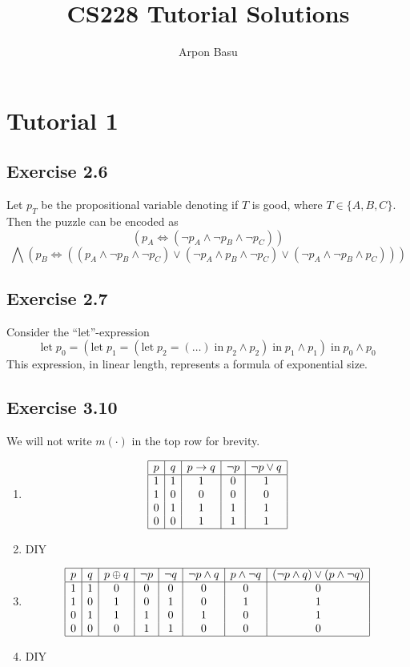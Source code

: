 \documentclass{article}
\title{CS228 Tutorial Solutions}
\author{Arpon Basu}
\begin{document}
\maketitle
\tableofcontents
\pagebreak
\section{Tutorial 1}
\subsection*{Exercise 2.6}
Let $p_T$ be the propositional variable denoting if $T$ is good, where $T\in\{A, B, C\}$. 
Then the puzzle can be encoded as 
$$(p_A\Leftrightarrow (\lnot p_A\wedge\lnot p_B\wedge\lnot p_C))$$
$$\bigwedge (p_B\Leftrightarrow ((p_A\wedge\lnot p_B\wedge\lnot p_C)\lor (\lnot p_A\wedge p_B\wedge\lnot p_C)\lor (\lnot p_A\wedge\lnot p_B\wedge p_C)))$$
\subsection*{Exercise 2.7}
Consider the ``let''-expression 
$$\mathrm{let}\; p_0 = (\mathrm{let}\; p_1 = (\mathrm{let}\; p_2 = (\ldots) \;\mathrm{in}\; p_2\wedge p_2) \;\mathrm{in}\; p_1\wedge p_1) \;\mathrm{in}\; p_0\wedge p_0$$
This expression, in linear length, represents a formula of exponential size.
\subsection*{Exercise 3.10}
We will not write $m(\cdot)$ in the top row for brevity.
\begin{enumerate}[label=(\alph*)]
    \item \[
        \begin{array}{|c|c|c|c|c|}
            \hline
        p & q & p\to q & \lnot p & \lnot p\lor q \\
        \hline
        1 & 1 & 1 & 0 & 1 \\
        1 & 0 & 0 & 0 & 0 \\
        0 & 1 & 1 & 1 & 1 \\
        0 & 0 & 1 & 1 & 1 \\
        \hline
        \end{array}
        \]
    \item DIY
    \item  \[
    \begin{array}{|c|c|c|c|c|c|c|c|}
        \hline
    p & q & p\oplus q & \lnot p & \lnot q & \lnot p\wedge q & p\wedge\lnot q & (\lnot p\wedge q)\lor(p\wedge \lnot q)\\
    \hline
    1 & 1 & 0 & 0 & 0 & 0 & 0 & 0\\
    1 & 0 & 1 & 0 & 1 & 0 & 1 & 1\\
    0 & 1 & 1 & 1 & 0 & 1 & 0 & 1\\
    0 & 0 & 0 & 1 & 1 & 0 & 0 & 0\\
    \hline
    \end{array}
    \]
    \item DIY
\end{enumerate}
\end{document}
